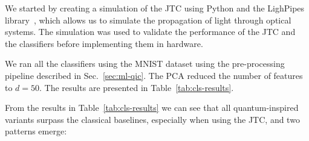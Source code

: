 \documentclass[twocolumn]{article} %
\begin{document}
We started by creating a simulation of the JTC using Python and the LighPipes library~\cite{lightpipes2021}, which allows us to simulate the propagation of light through optical systems. 
The simulation was used to validate the performance of the JTC and the classifiers before implementing them in hardware.

We ran all the classifiers using the MNIST dataset using the pre-processing pipeline described in Sec.~\ref{sec:ml-qic}. 
The PCA reduced the number of features to \(d=50\). The results are presented in Table~\ref{tab:cls-results}. 

\begin{table}
  \centering
  \footnotesize                     %
  \setlength{\tabcolsep}{4pt}       %
  \caption{Balanced accuracy (\%\,mean $\pm$ std.) on MNIST. For the CNM-C the encoding is not applicable, so we leave it empty. For the QNM-C we show the results for the three encodings described in Sec.~\ref{par:encodings}. The Fidelity distance is being calculated using the software implementation of the JTC. The two best results are in \textbf{bold}.}
  \label{tab:cls-results}
\end{table}

From the results in Table~\ref{tab:cls-results} we can see that all quantum-inspired variants surpass the classical baselines, especially when using the JTC, and two patterns emerge:
\end{document}
